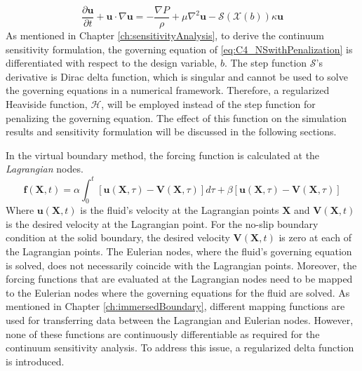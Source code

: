 %
\begin{equation}\label{eq:C4_NSwithPenalization}
    \frac{\partial \mathbf{u}}{\partial t} + \mathbf{u} \cdot \nabla \mathbf{u} = 
    -\frac{\nabla P}{\rho} + \mu \nabla^2 \mathbf{u} -\mathcal{S}(\mathcal{X}(b)) \kappa \mathbf{u}
\end{equation}
%
As mentioned in Chapter \ref{ch:sensitivityAnalysis}, to derive the continuum sensitivity formulation, the governing equation of \eqref{eq:C4_NSwithPenalization} is differentiated with respect to the design variable, $b$. The step function $\mathcal{S}$'s derivative is Dirac delta function, which is singular and cannot be used to solve the governing equations in a numerical framework. Therefore, a regularized Heaviside function, $\mathcal{H}$, will be employed instead of the step function for penalizing the governing equation. The effect of this function on the simulation results and sensitivity formulation will be discussed in the following sections.

In the virtual boundary method, the forcing function is calculated at the \emph{Lagrangian} nodes.
%
\begin{equation}\label{eq:C3_feedbackForcingFunction}
    \mathbf{f}(\mathbf{X}, t) = 
    \alpha \int_0^t \left[ \mathbf{u}(\mathbf{X}, \tau) - \mathbf{V}(\mathbf{X}, \tau) \right] d\tau + 
    \beta \left[ \mathbf{u}(\mathbf{X}, \tau) - \mathbf{V}(\mathbf{X}, \tau) \right]
\end{equation}
%
Where $\mathbf{u}(\mathbf{X}, t)$ is the fluid's velocity at the Lagrangian points $\mathbf{X}$ and $\mathbf{V}(\mathbf{X}, t)$ is the desired velocity at the Lagrangian point. For the no-slip boundary condition at the solid boundary, the desired velocity $\mathbf{V}(\mathbf{X}, t)$ is zero at each of the Lagrangian points. The Eulerian nodes, where the fluid's governing equation is solved, does not necessarily coincide with the Lagrangian points. Moreover, the forcing functions that are evaluated at the Lagrangian nodes need to be mapped to the Eulerian nodes where the governing equations for the fluid are solved. As mentioned in Chapter \ref{ch:immersedBoundary}, different mapping functions are used for transferring data between the Lagrangian and Eulerian nodes. However, none of these functions are continuously differentiable as required for the continuum sensitivity analysis. To address this issue, a regularized delta function is introduced.
